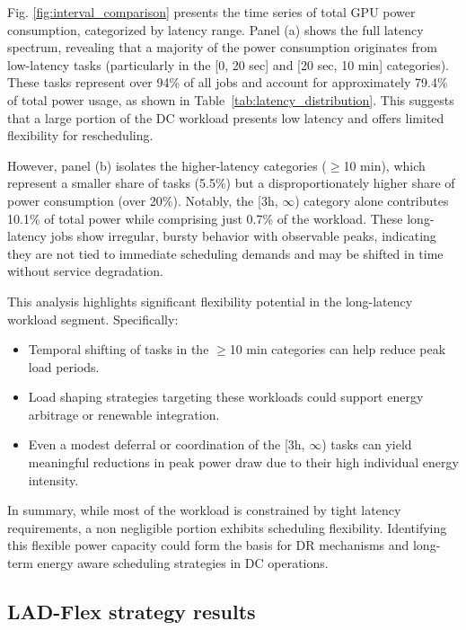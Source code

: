 \documentclass[preprint,12pt]{elsarticle}
\begin{document}
Fig. \ref{fig:interval_comparison} presents the time series of total GPU power consumption, categorized by latency range. Panel (a) shows the full latency spectrum, revealing that a majority of the power consumption originates from low-latency tasks (particularly in the [0, 20 sec] and [20 sec, 10 min] categories). These tasks represent over 94\% of all jobs and account for approximately 79.4\% of total power usage, as shown in Table~\ref{tab:latency_distribution}. This suggests that a large portion of the DC workload presents low latency and offers limited flexibility for rescheduling. 

However, panel (b) isolates the higher-latency categories ($\geq$10 min), which represent a smaller share of tasks (5.5\%) but a disproportionately higher share of power consumption (over 20\%). Notably, the [3h, $\infty$) category alone contributes 10.1\% of total power while comprising just 0.7\% of the workload. These long-latency jobs show irregular, bursty behavior with observable peaks, indicating they are not tied to immediate scheduling demands and may be shifted in time without service degradation.

This analysis highlights significant flexibility potential in the long-latency workload segment. Specifically:
\begin{itemize}
    \item Temporal shifting of tasks in the $\geq$10 min categories can help reduce peak load periods.
    \item Load shaping strategies targeting these workloads could support energy arbitrage or renewable integration.
    \item Even a modest deferral or coordination of the [3h, $\infty$) tasks can yield meaningful reductions in peak power draw due to their high individual energy intensity.
\end{itemize}

In summary, while most of the workload is constrained by tight latency requirements, a non negligible portion exhibits scheduling flexibility. Identifying this flexible power capacity could form the basis for DR mechanisms and long-term energy aware scheduling strategies in DC operations.





\subsection{LAD-Flex strategy results} \label{LAD_flex_results}
\end{document}

